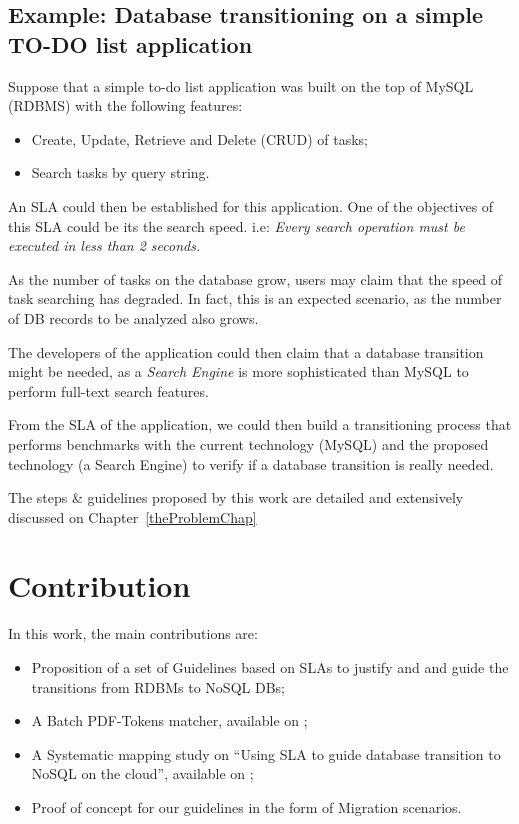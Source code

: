 \subsection{Example: Database transitioning on a simple TO-DO list application}

Suppose that a simple to-do list application was built on the top of MySQL (RDBMS) with the following features:

\begin{itemize}
   \item{Create, Update, Retrieve and Delete (CRUD) of tasks;}
   \item{Search tasks by query string.}
\end{itemize}

An SLA could then be established for this application. One of the objectives of this SLA could be its the search speed. i.e: \textit{Every search operation must be executed in less than 2 seconds.}

As the number of tasks on the database grow, users may claim that the speed of task searching has degraded. In fact, this is an expected scenario, as the number of DB records to be analyzed also grows.

The developers of the application could then claim that a database transition might be needed, as a \textit{Search Engine} is more sophisticated than MySQL to perform full-text search features. 

From the SLA of the application, we could then build a transitioning process that performs benchmarks with the current technology (MySQL) and the proposed technology (a Search Engine) to verify if a database transition is really needed.

The steps \& guidelines proposed by this work are detailed and extensively discussed on Chapter~\ref{theProblemChap}

\section{Contribution}

In this work, the main contributions are: 

\begin{itemize}
   \item{Proposition of a set of Guidelines based on SLAs to justify and and guide the transitions from RDBMs to NoSQL DBs;}
   \item{A Batch PDF-Tokens matcher, available on \cite{pythonBatchPDFTokenMatcher};}
   \item{A Systematic mapping study on ``Using SLA to guide database transition to NoSQL on the cloud'', available on \cite{fabioMartinSM};}
   \item{Proof of concept for our guidelines in the form of Migration scenarios.}
\end{itemize}

